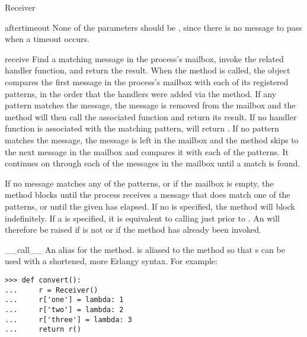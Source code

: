 \documentclass{howto}
\begin{document}
\begin{classdesc}{Receiver}{}
\begin{methoddesc}{after}{timeout}
None of the  parameters should be , since
there is no message to pass when a timeout occurs.
\end{methoddesc}

\begin{methoddesc}{receive}{}
Find a matching message in the process's mailbox, invoke the related handler
function, and return the result. When the  method is called,
the  object compares the first message in the process's mailbox
with each of its registered patterns, in the order that the handlers were added
via the  method. If any pattern matches the message, the
message is removed from the mailbox and the  method will then
call the associated function and return its result. If no handler function is
associated with the matching pattern,  will return
. If no pattern matches the message, the message is left in the
mailbox and the  method skips to the next message in the
mailbox and compares it with each of the patterns. It continues on through each
of the messages in the mailbox until a match is found.

If no message matches any of the patterns, or if the mailbox is empty, the
 method blocks until the process receives a message that does
match one of the patterns, or until the given  has elapsed. If no
 is specified, the  method will block
indefinitely. If a  is specified, it is equivalent to calling
 just prior to
. An  will therefore be raised if
 is not  or if the  method has
already been invoked.
\end{methoddesc}

\begin{methoddesc}{__call__}{}
\opindex{()}
An alias for the  method.  is aliased to
the  method so that s can be used with a
shortened, more Erlangy syntax. For example:
\begin{verbatim}
>>> def convert():
...     r = Receiver()
...     r['one'] = lambda: 1
...     r['two'] = lambda: 2
...     r['three'] = lambda: 3
...     return r()
\end{verbatim}
\end{methoddesc}


\end{classdesc}
\end{document}
